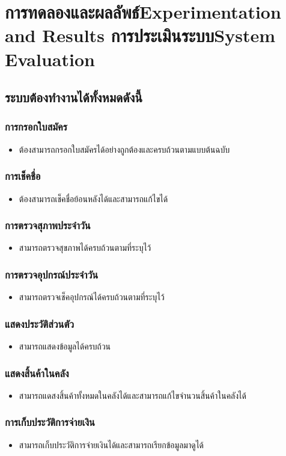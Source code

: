 \chapter{\ifproject%
\ifcpe การทดลองและผลลัพธ์\else Experimentation and Results\fi
\else%
\ifcpe การประเมินระบบ\else System Evaluation\fi
\fi}


\section{ระบบต้องทำงานได้ทั้งหมดดังนี้}
\subsection{การกรอกใบสมัคร}
\begin{itemize}
    \item ต้องสามารถกรอกใบสมัครได้อย่างถูกต้องและครบถ้วนตามแบบต้นฉบับ
\end{itemize}
\subsection{การเช็คชื่อ}
\begin{itemize}
    \item ต้องสามารถเช็คชื่อย้อนหลังได้และสามารถแก้ไขได้
\end{itemize}
\subsection{การตรวจสุภาพประจำวัน}
\begin{itemize}
    \item สามารถตรวจสุขภาพได้ครบถ้วนตามที่ระบุไว้
\end{itemize}
\subsection{การตรวจอุปกรณ์ประจำวัน}
\begin{itemize}
    \item สามารถตรวจเช็คอุปกรณ์ได้ครบถ้วนตามที่ระบุไว้
\end{itemize}
\subsection{แสดงประวัติส่วนตัว}
\begin{itemize}
    \item สามารถแสดงข้อมูลได้ครบถ้วน
\end{itemize}
\subsection{แสดงสิ้นค้าในคลัง}
\begin{itemize}
    \item สามารถแดสงสิ้นค้าทั้งหมดในคลังได้และสามารถแก้ไขจำนวนสิ้นค้าในคลังได้
\end{itemize}
\subsection{การเก็บประวัติการจ่ายเงิน}
\begin{itemize}
    \item สามารถเก็บประวัติการจ่ายเงินได้และสามารถเรียกข้อมูลมาดูได้
\end{itemize}


